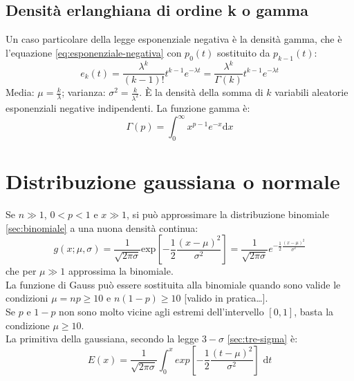 \subsection{Densità erlanghiana di ordine k o gamma} %
\label{subsec:gamma}
Un caso particolare della legge esponenziale negativa è la densità gamma, che è l'equazione \ref{eq:esponenziale-negativa} con ${ p }_{ 0 }\left( t \right) $ sostituito da ${ p }_{ k-1 }\left( t \right) $:
\begin{equation}
{ e }_{ k }\left( t \right) =\frac { { \lambda  }^{ k } }{ \left( k-1 \right) ! } { t }^{ k-1 }{ e }^{ -\lambda t }=\frac { { \lambda  }^{ k } }{ \Gamma \left( k \right)  } { t }^{ k-1 }{ e }^{ -\lambda t }
\end{equation}
Media: $\mu =\frac { k }{ \lambda  } $; varianza: ${ \sigma  }^{ 2 }=\frac { k }{ { \lambda  }^{ 2 } } $. \`E la densità della somma di $k$ variabili aleatorie esponenziali negative indipendenti.
La funzione gamma è:
\begin{equation}
\label{eq:funzione-gamma}
\Gamma \left( p \right) =\int _{ 0 }^{ \infty  }{ { x }^{ p-1 }{ e }^{ -x } \textrm{d}x } 
\end{equation}

\section{Distribuzione gaussiana o normale} %
\label{sec:gauss}
Se $n\gg 1$, $0<p<1$ e $x\gg 1$, si può approssimare la distribuzione binomiale \ref{sec:binomiale} a una nuona densità continua:
\begin{equation}
\label{eq:gauss}
g\left( x;\mu ,\sigma  \right) =\frac { 1 }{ \sqrt { 2\pi \sigma  }  } \textrm{exp}\left[ -\frac { 1 }{ 2 } \frac { { \left( x-\mu  \right)  }^{ 2 } }{ { \sigma  }^{ 2 } }  \right] =\frac { 1 }{ \sqrt { 2\pi \sigma  }  } { e }^{ -\frac { 1 }{ 2 } \frac { { \left( x-\mu  \right)  }^{ 2 } }{ { \sigma  }^{ 2 } }  }
\end{equation}
che per $\mu \gg 1$ approssima la binomiale. \\La funzione di Gauss può essere sostituita alla binomiale quando sono valide le condizioni $\mu =np \ge 10$ e $n(1-p) \ge 10$ [valido in pratica\dots]. \\Se $p$ e $1-p$ non sono molto vicine agli estremi dell'intervello $[0,1]$, basta la condizione $\mu \ge 10$.
\\ La primitiva della gaussiana, secondo la legge $3-\sigma$ \ref{sec:tre-sigma} è:
\begin{equation}
E\left( x \right) =\frac { 1 }{ \sqrt { 2\pi \sigma  }  } \int _{ 0 }^{ x }{ { exp }\left[ -\frac { 1 }{ 2 } \frac { { \left( t-\mu  \right)  }^{ 2 } }{ { \sigma  }^{ 2 } }  \right] \textrm{ d}t } 
\end{equation}

